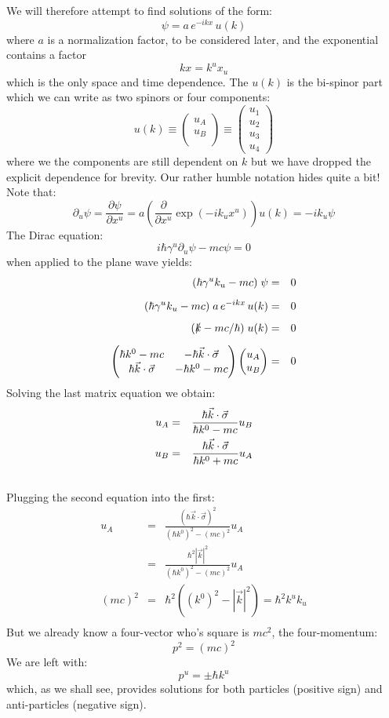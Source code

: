 \documentclass[12pt]{book}
\begin{document}
We will therefore attempt to find solutions of the form:
$$\psi = a \, e^{-ikx} \, u(k)$$
where $a$ is a normalization factor, to be considered later, and the exponential contains a factor
$$kx = k^u x_u$$
which is the only space and time dependence.  The $u(k)$ is the bi-spinor part which we can write as two spinors or four components:
$$u(k) \equiv \begin{pmatrix} u_A \\ u_B \\ \end{pmatrix} \equiv 
\begin{pmatrix} u_1 \\ u_2\\ u_3 \\ u_4 \end{pmatrix}
$$
where we the components are still dependent on $k$ but we have dropped the explicit dependence for brevity.  Our rather humble notation hides quite a bit!  Note that:
$$\partial_u \psi = \frac{\partial \psi}{\partial x^u} = a \left( \frac{\partial}{\partial x^u} \exp(-ik_u x^u)\right) u(k) = -ik_u \psi$$
The Dirac equation:
$$i\hbar \gamma^u \partial_u \psi - mc \psi = 0$$
when applied to the plane wave yields:
\begin{eqnarray*}
(\hbar \gamma^u k_u - mc) \; \psi &=& 0 \\[5pt]
(\hbar \gamma^u k_u - mc) \; a \, e^{-ikx} \, u(k) &=& 0 \\[5pt]
(\slashed{k} - mc/\hbar) \; u(k) &=& 0 \\[5pt]
\begin{pmatrix}
\hbar k^0-mc & - \hbar \vec{k}\cdot\vec{\sigma} \\
\hbar \vec{k}\cdot\vec{\sigma} & -\hbar k^0-mc \\
\end{pmatrix}
\begin{pmatrix} 
u_A\\
u_B\\
\end{pmatrix}&=&0\\
\end{eqnarray*}
Solving the last matrix equation we obtain:
\begin{eqnarray}
u_A &=& \frac{\hbar\vec{k}\cdot\vec{\sigma}}{\hbar k^0-mc} u_B \label{eqn:ua} \\
u_B &=& \frac{\hbar\vec{k}\cdot\vec{\sigma}}{\hbar k^0+mc} u_A \label{eqn:ub} \\
\notag
\end{eqnarray}
Plugging the second equation into the first:
\begin{eqnarray*}
u_A &=& \frac{(\hbar\vec{k}\cdot\vec{\sigma})^2}{(\hbar k^0)^2-(mc)^2} u_A \\
    &=& \frac{\hbar^2|\vec{k}|^2}{(\hbar k^0)^2-(mc)^2} u_A \\
(mc)^2 &=& \hbar^2((k^0)^2-|\vec{k}|^2) = \hbar^2 k^u k_u \\
\end{eqnarray*}
But we already know a four-vector who's square is $mc^2$, the four-momentum:
$$p^2 = (mc)^2$$
We are left with:
$$p^u = \pm \hbar k^u$$
which, as we shall see, provides solutions for both particles (positive sign) and anti-particles (negative sign).\\[5pt]
\end{document}
